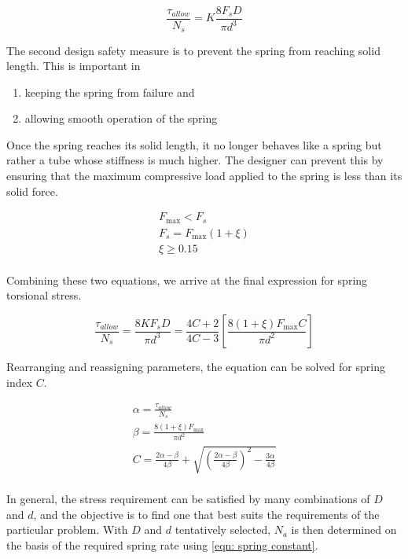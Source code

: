 \documentclass[
10pt,
a4paper,
openany,
svgnames,
]{book}
\begin{document}
\begin{equation}
  \frac{\tau _{allow}}{N_s} = K\frac{8F_sD}{\pi d^3}
\end{equation}

The second design safety measure is to prevent the spring from reaching solid length. This is important in
\begin{enumerate}
\item keeping the spring from failure and
\item allowing smooth operation of the spring
\end{enumerate}
Once the spring reaches its solid length, it no longer behaves like a spring but rather a tube whose stiffness is much higher. The designer can prevent this by ensuring that the maximum compressive load applied to the spring is less than its solid force.

\begin{equation}
  \begin{gathered}
    F_{\max} < F_s \\ 
    F_s = F_{\max}(1 + \xi ) \\ 
    \xi  \geqslant 0.15 \\ 
  \end{gathered}
\end{equation}

Combining these two equations, we arrive at the final expression for spring torsional stress.

\[\frac{\tau _{allow}}{N_s} = \frac{8KF_sD}{\pi d^3} = \frac{4C + 2}{4C - 3}\left[ \frac{8(1 + \xi )F_{\max }C}{\pi d^2} \right]\]

Rearranging and reassigning parameters, the equation can be solved for spring index $C$.

\begin{equation}
  \begin{gathered}
    \alpha  = \frac{\tau_{allow}}{N_s} \\ 
    \beta  = \frac{8(1 + \xi )F_{\max}}{\pi d^2} \\ 
    C = \frac{2\alpha  - \beta }{4\beta} + \sqrt {\left( \frac{2\alpha  - \beta}{4\beta} \right)^2 - \frac{3\alpha}{4\beta}}  \\ 
  \end{gathered}
\end{equation}

In general, the stress requirement can be satisfied by many combinations of $D$ and $d$, and the objective is to find one that best suits the requirements of the particular problem. With $D$ and $d$ tentatively selected, $N_a$ is then determined on the basis of the required spring rate using \cref{eqn: spring constant}.
\end{document}
